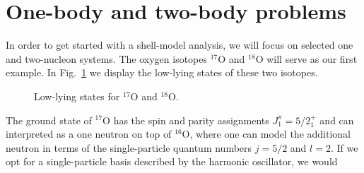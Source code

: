 \section{One-body and two-body problems}
In order to get started with a shell-model analysis, we will focus on selected one and two-nucleon systems.
The oxygen isotopes $^{17}$O and $^{18}$O will serve as our first example. 
In Fig.~\ref{fig:oxygenspectra} we display the low-lying states of these two isotopes. 
\begin{figure}
\caption{Low-lying states for  $^{17}$O and $^{18}$O.}
\label{fig:oxygenspectra}
\end{figure}
The ground state of $^{17}$O has the spin and parity assignments
$J_1^{\pi}=5/2_1^+$ and can interpreted as a one neutron on top of
$^{16}$O, where one can model the additional neutron in terms of the
single-particle quantum numbers $j=5/2$ and $l=2$.  If we opt for a
single-particle basis described by the harmonic oscillator, we would
